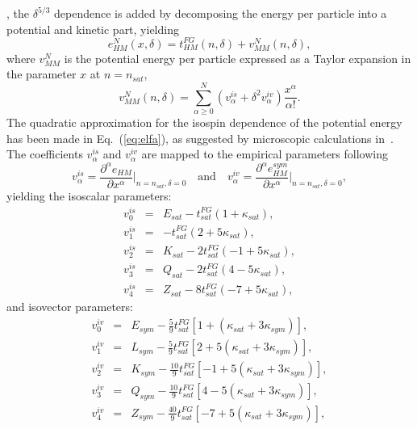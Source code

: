 , the $\delta^{5/3}$ dependence is added by decomposing 
the energy per particle into a potential and kinetic part, yielding
%
\begin{equation}
  e^N_{HM}(x,\delta) = t_{HM}^{FG}(n,\delta) +
  v_{MM}^N(n,\delta),\label{eq:meta}
\end{equation}
%
where $v_{MM}^N$ is the potential energy per particle expressed as a Taylor expansion
in the parameter $x$ at $n = n_{sat}$,
%
\begin{equation}
  v_{MM}^N(n,\delta) = \sum_{\alpha \geq 0}^N(v_\alpha^{is} +
  \delta^2v_\alpha^{iv})\frac{x^\alpha}{\alpha!}\label{eq:elfa}.
\end{equation}
%
The quadratic approximation for the isospin dependence of the potential energy 
has been made in Eq.~(\ref{eq:elfa}), as suggested by microscopic calculations 
in~\cite{Vidana2009}. The coefficients $v_\alpha^{is}$ and $v_\alpha^{iv}$ are
mapped to the empirical parameters following
%
\begin{equation}
  v_\alpha^{is} = \frac{\partial^\alpha e_{HM}}{\partial
  x^\alpha}\bigg|_{n=n_{sat},\delta=0} \quad \text{and} \quad v_\alpha^{iv} = \frac{\partial^\alpha e_{HM}^{sym}}{\partial
x^\alpha}\bigg|_{n=n_{sat},\delta=0},\label{eq:def_pars}
\end{equation}
%
yielding the isoscalar parameters:
%
\begin{eqnarray}
  v_0^{is} &=& E_{sat} - t_{sat}^{FG}(1+\kappa_{sat}),\\
  v_1^{is} &=& -t_{sat}^{FG}(2+5\kappa_{sat}),\\
  v_2^{is} &=& K_{sat} - 2t_{sat}^{FG}(-1+5\kappa_{sat}),\\
  v_3^{is} &=& Q_{sat} - 2t_{sat}^{FG}(4-5\kappa_{sat}),\\
  v_4^{is} &=& Z_{sat} - 8t_{sat}^{FG}(-7+5\kappa_{sat}),
\end{eqnarray}
%
and isovector parameters:
%
\begin{eqnarray}
  v_0^{iv} &=& E_{sym} - \frac{5}{9}t_{sat}^{FG}[1+(\kappa_{sat}+3\kappa_{sym})],\\
  v_1^{iv} &=& L_{sym} - \frac{5}{9}t_{sat}^{FG}[2+5(\kappa_{sat}+3\kappa_{sym})],\\
  v_2^{iv} &=& K_{sym} - \frac{10}{9}t_{sat}^{FG}[-1+5(\kappa_{sat}
  +3\kappa_{sym})],\\
  v_3^{iv} &=& Q_{sym} - \frac{10}{9}t_{sat}^{FG}[4-5(\kappa_{sat}+3\kappa_{sym})],\\
  v_4^{iv} &=& Z_{sym} -
  \frac{40}{9}t_{sat}^{FG}[-7+5(\kappa_{sat}+3\kappa_{sym})],
\end{eqnarray}
%

